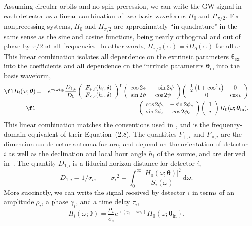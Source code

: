 \documentclass{iopart}
\begin{document}
Assuming circular orbits and no spin precession, we can write the \ac{GW} signal in each detector as a linear combination of two basis waveforms $H_0$ and $H_{\pi/2}$. For nonprecessing systems, $H_0$ and $H_{\pi/2}$ are approximately ``in quadrature'' in the same sense as the sine and cosine functions, being nearly orthogonal and out of phase by ${\pi/2}$ at all frequencies. In other words, $H_{\pi/2}(\omega) = i H_0(\omega)$ for all $\omega$. This linear combination isolates all dependence on the extrinsic parameters $\boldsymbol\theta_\mathrm{ex}$ into the coefficients and all dependence on the intrinsic parameters $\boldsymbol\theta_\mathrm{in}$ into the basis waveform,
%
\begin{eqnarray}
	\fl H_i(\omega; \boldsymbol\theta) &=& e^{-i\omega t_\oplus}\frac{D_{1,i}}{D_\mathrm{L}}
	\left(\begin{array}{cc}
		F_{+,i}(h_i, \delta) \\
		F_{\times,i}(h_i, \delta)
	\end{array}\right)^\intercal
	\left(\begin{array}{cc}
		\cos{2\psi} & -\sin{2\psi} \\
		\sin{2\psi} & \cos{2\psi}
	\end{array}\right)
	\left(\begin{array}{cc}
		\frac{1}{2}\left(1+\cos^2{\iota}\right) & 0 \\
		0 & \cos{\iota}
	\end{array}\right) \nonumber\\\fl &\cdot&
	\left(\begin{array}{cc}
		\cos{2\phi_c} & -\sin{2\phi_c} \\
		\sin{2\phi_c} & \cos{2\phi_c}
	\end{array}\right)
	\left(\begin{array}{cc}
		1 \\
		\imath
	\end{array}\right) H_0(\omega; \boldsymbol\theta_\mathrm{in}).
\end{eqnarray}
%
This linear combination matches the conventions used in \cite{PhysRevD.83.084002}, and is the frequency-domain equivalent of their Equation~(2.8). The quantities $F_{+,i}$ and $F_{\times,i}$ are the dimensionless detector antenna factors, and depend on the orientation of detector $i$ as well as the declination and local hour angle $h_i$ of the source, and are derived in~\cite{PhysRevD.63.042003}. The quantity $D_{1,i}$ is a fiducial horizon distance for detector $i$,
%
\begin{equation}\label{eq:horizon}
D_{1,i} = 1 / \sigma_i, \qquad {\sigma_i}^2 = \int_0^\infty \frac{\left|H_0(\omega; \mathbf \theta)\right|^2}{S_i(\omega)} \,\mathrm{d}\omega.
\end{equation}
%
More succinctly, we can write the signal received by detector $i$ in terms of an amplitude $\rho_i$, a phase $\gamma_i$, and a time delay $\tau_i$,
%
\begin{equation}\label{eq:signal-model}
	H_i (\omega; \boldsymbol\theta) = \frac{\rho_i}{\sigma_i} e^{\imath (\gamma_i - \omega \tau_i)} H_0(\omega; \boldsymbol\theta_\mathrm{in}).
\end{equation}
\end{document}
